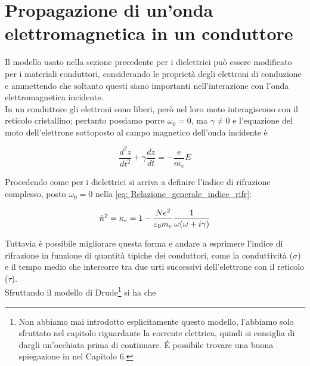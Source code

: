 \section{Propagazione di un'onda elettromagnetica in un conduttore}

Il modello usato nella sezione precedente per i dielettrici può essere modificato per i materiali conduttori, considerando le proprietà degli elettroni di conduzione e ammettendo che soltanto questi siano importanti nell'interazione con l'onda elettromagnetica incidente. \\

In un conduttore gli elettroni sono liberi, però nel loro moto interagiscono con il reticolo cristallino; pertanto possiamo porre $\omega_0 = 0$, ma $\gamma \neq 0$ e l'equazione del moto dell'elettrone sottoposto al campo magnetico dell'onda incidente è 

\begin{tcolorbox}[colback=yellow!10!white, colframe=orange!70!black, boxrule=0.8pt]
\begin{equation}
    \frac{d^2 z}{dt^2} + \gamma \frac{dz}{dt} = - \frac{e}{m_e} E
\end{equation}
\end{tcolorbox}

Procedendo come per i dielettrici si arriva a definire l'indice di rifrazione complesso, posto $\omega_0 = 0$ nella \eqref{eq: Relazione_generale_indice_rifr}:

\begin{tcolorbox}[colback=yellow!10!white, colframe=orange!70!black, boxrule=0.8pt]
\begin{equation} \label{eq: indice_rifr_conduttori}
    \tilde{n}^2 = \kappa_e = 1 - \frac{Ne^2}{\varepsilon_0 m_e} \frac{1}{\omega(\omega + i \gamma)}
\end{equation}
\end{tcolorbox}

Tuttavia è possibile migliorare questa forma e andare a esprimere l'indice di rifrazione in funzione di quantità tipiche dei conduttori, come la conduttività ($\sigma$) e il tempo medio che intercorre tra due urti successivi dell'elettrone con il reticolo ($\tau$).\\

Sfruttando il modello di Drude\footnote{Non abbiamo mai introdotto esplicitamente questo modello, l'abbiamo solo sfruttato nel capitolo riguardante la corrente elettrica, quindi si consiglia di dargli un'occhiata prima di continuare. \'E possibile trovare una buona spiegazione in \cite{ElettromagnetismoeOnde} nel Capitolo 6.} si ha che 

